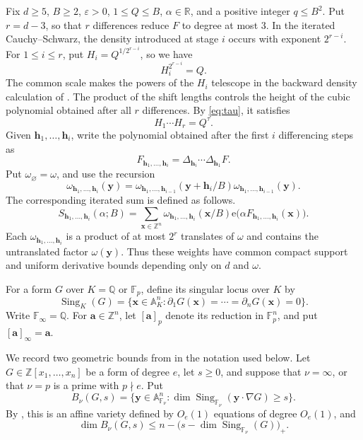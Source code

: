 \documentclass[reqno,a4paper,11pt]{amsart}
\numberwithin{equation}{section}
\newcommand{\ZZ}{\mathbb Z}
\newcommand{\QQ}{\mathbb Q}
\newcommand{\RR}{\mathbb R}
\newcommand{\x}{\mathbf{x}}
\newcommand{\h}{\mathbf h}
\newcommand{\e}{\mathrm e}
\newcommand{\eps}{\varepsilon}
\theoremstyle{plain}
\theoremstyle{definition}
\begin{document}
Fix \(d\geq5\), \(B\geq2\), \(\eps>0\), \(1\leq Q\leq B\), \(\alpha\in\RR\), and a positive integer \(q\leq B^2\).
Put \(r=d-3\), so that \(r\) differences reduce \(F\) to degree at most \(3\).
In the iterated Cauchy--Schwarz, the density introduced at stage \(i\) occurs with exponent \(2^{r-i}\).
For \(1\leq i\leq r\), put \(H_i=Q^{1/2^{r-i}}\), so we have
\begin{equation}
 H_i^{2^{r-i}}
 =Q.
 \label{eq:differencing-scale}
\end{equation}
The common scale makes the powers of the \(H_i\) telescope in the backward density calculation of \cite[Proof of Lemma~3.5]{bp}.
The product of the shift lengths controls the height of the cubic polynomial obtained after all \(r\) differences.
By \eqref{eq:tau}, it satisfies
\begin{equation}
 H_1\cdots H_r
 =Q^\tau.
 \label{eq:differencing-product}
\end{equation}
Given \(\h_1,\ldots,\h_i\), write the polynomial obtained after the first \(i\) differencing steps as
\begin{equation}
 F_{\h_1,\ldots,\h_i}
 =\Delta_{\h_i}\cdots\Delta_{\h_1}F.
 \label{eq:iterated-difference}
\end{equation}
Put \(\omega_\varnothing=\omega\), and use the recursion
\[
 \omega_{\h_1,\ldots,\h_i}(\mathbf y)
 =
 \omega_{\h_1,\ldots,\h_{i-1}}(\mathbf y+\h_i/B)
 \omega_{\h_1,\ldots,\h_{i-1}}(\mathbf y).
\]
The corresponding iterated sum is defined as follows.
\[
 S_{\h_1,\ldots,\h_i}(\alpha;B)
 =
 \sum_{\x\in\ZZ^n}
 \omega_{\h_1,\ldots,\h_i}(\x/B)
 \e\bigl(\alpha F_{\h_1,\ldots,\h_i}(\x)\bigr).
\]
Each \(\omega_{\h_1,\ldots,\h_i}\) is a product of at most \(2^r\) translates of \(\omega\) and contains the untranslated factor \(\omega(\mathbf y)\).
Thus these weights have common compact support and uniform derivative bounds depending only on \(d\) and \(\omega\).

For a form \(G\) over \(K=\QQ\) or \(\mathbb F_p\), define its singular locus over \(K\) by
\[
 \operatorname{Sing}_K(G)
 =
 \{\x\in\mathbb A_K^n:
 \partial_1G(\x)=\cdots=\partial_nG(\x)=0\}.
\]
Write \(\mathbb F_\infty=\QQ\).
For \(\mathbf a\in\ZZ^n\), let \([\mathbf a]_p\) denote its reduction in \(\mathbb F_p^n\), and put \([\mathbf a]_\infty=\mathbf a\).

We record two geometric bounds from \cite{bp} in the notation used below.
Let \(G\in\ZZ[x_1,\ldots,x_n]\) be a form of degree \(e\), let \(s\geq0\), and suppose that \(\nu=\infty\), or that \(\nu=p\) is a prime with \(p\nmid e\).
Put
\[
 B_\nu(G,s)
 =\{\mathbf y\in\mathbb A_{\mathbb F_\nu}^n:
 \dim\operatorname{Sing}_{\mathbb F_\nu}
 (\mathbf y\cdot\nabla G)\geq s\}.
\]
By \cite[Lemma~2.4]{bp}, this is an affine variety defined by \(O_e(1)\) equations of degree \(O_e(1)\), and
\begin{equation}\label{eq:singular-shift-bound}
 \dim B_\nu(G,s)
 \leq n-
 \bigl(s-\dim\operatorname{Sing}_{\mathbb F_\nu}(G)\bigr)_+.
\end{equation}
\end{document}
